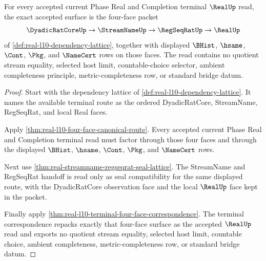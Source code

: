 \begin{theorem}
\label{thm:real-l10-four-face-no-completeness-exactness}
For every accepted current Phase Real and Completion terminal $\RealUp$ read, the exact accepted surface is the four-face packet
$$
\DyadicRatCoreUp \to \StreamNameUp \to \RegSeqRatUp \to \RealUp
$$
of \autoref{def:real-l10-dependency-lattice}, together with displayed $\BHist$, $\hsame$, $\Cont$, $\Pkg$, and $\NameCert$ rows on those faces. The read contains no quotient stream equality, selected host limit, countable-choice selector, ambient completeness principle, metric-completeness row, or standard bridge datum.
\end{theorem}
\begin{proof}
Start with the dependency lattice of \autoref{def:real-l10-dependency-lattice}. It names the available terminal route as the ordered DyadicRatCore, StreamName, RegSeqRat, and local Real faces.

Apply \autoref{thm:real-l10-four-face-canonical-route}. Every accepted current Phase Real and Completion terminal read must factor through those four faces and through the displayed $\BHist$, $\hsame$, $\Cont$, $\Pkg$, and $\NameCert$ rows.

Next use \autoref{thm:real-streamname-regseqrat-seal-lattice}. The StreamName and RegSeqRat handoff is read only as seal compatibility for the same displayed route, with the DyadicRatCore observation face and the local $\RealUp$ face kept in the packet.

Finally apply \autoref{thm:real-l10-terminal-four-face-correspondence}. The terminal correspondence repacks exactly that four-face surface as the accepted $\RealUp$ read and exports no quotient stream equality, selected host limit, countable choice, ambient completeness, metric-completeness row, or standard bridge datum.
\end{proof}

